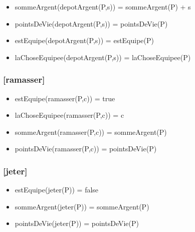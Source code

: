 \documentclass[11pt]{article}
\begin{document}
\begin{itemize}

\item sommeArgent(depotArgent(P,s)) = sommeArgent(P) + s\\
\label{sec-1.7.6.1}


\item pointsDeVie(depotArgent(P,s)) = pointsDeVie(P)\\
\label{sec-1.7.6.2}


\item estEquipe(depotArgent(P,s)) = estEquipe(P)\\
\label{sec-1.7.6.3}


\item laChoseEquipee(depotArgent(P,s)) = laChoseEquipee(P)\\
\label{sec-1.7.6.4}


\end{itemize} %
\subsubsection{[ramasser]}
\label{sec-1.7.7}

\begin{itemize}

\item estEquipe(ramasser(P,c)) = true\\
\label{sec-1.7.7.1}


\item laChoseEquipee(ramasser(P,c)) = c\\
\label{sec-1.7.7.2}


\item sommeArgent(ramasser(P,c)) = sommeArgent(P)\\
\label{sec-1.7.7.3}


\item pointsDeVie(ramasser(P,c)) = pointsDeVie(P)\\
\label{sec-1.7.7.4}


\end{itemize} %
\subsubsection{[jeter]}
\label{sec-1.7.8}

\begin{itemize}

\item estEquipe(jeter(P)) = false\\
\label{sec-1.7.8.1}


\item sommeArgent(jeter(P)) = sommeArgent(P)\\
\label{sec-1.7.8.2}


\item pointsDeVie(jeter(P)) = pointsDeVie(P)\\
\label{sec-1.7.8.3}



 
      
\end{itemize} %
\end{document}
